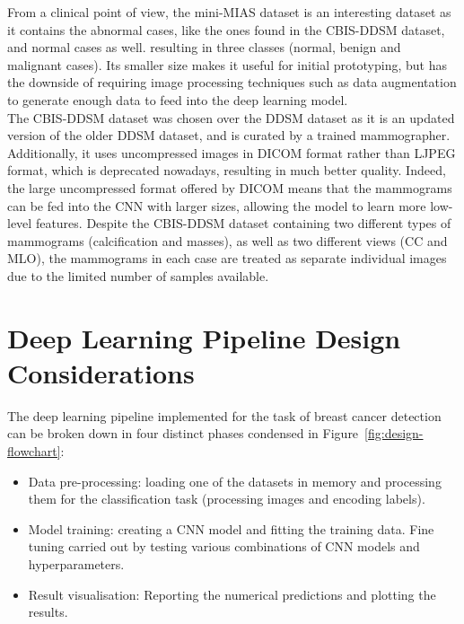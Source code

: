 From a clinical point of view, the mini-MIAS dataset is an interesting dataset as it contains the abnormal cases, like the ones found in the CBIS-DDSM dataset, and normal cases as well. resulting in three classes (normal, benign and malignant cases). Its smaller size makes it useful for initial prototyping, but has the downside of requiring image processing techniques such as data augmentation to generate enough data to feed into the deep learning model.\\

The CBIS-DDSM dataset was chosen over the DDSM dataset as it is an updated version of the older DDSM dataset, and is curated by a trained mammographer. Additionally, it uses uncompressed images in DICOM format rather than LJPEG format, which is deprecated nowadays, resulting in much better quality. Indeed, the large uncompressed format offered by DICOM means that the mammograms can be fed into the CNN with larger sizes, allowing the model to learn more low-level features. Despite the CBIS-DDSM dataset containing two different types of mammograms (calcification and masses), as well as two different views (CC and MLO), the mammograms in each case are treated as separate individual images due to the limited number of samples available.


\section{Deep Learning Pipeline Design Considerations}

The deep learning pipeline implemented for the task of breast cancer detection can be broken down in four distinct phases condensed in Figure~\ref{fig:design-flowchart}:

\begin{itemize}
    \item Data pre-processing: loading one of the datasets in memory and processing them for the classification task (processing images and encoding labels).
    \item Model training: creating a CNN model and fitting the training data. Fine tuning carried out by testing various combinations of CNN models and hyperparameters.
    \item Result visualisation: Reporting the numerical predictions and plotting the results.
    \end{itemize}

